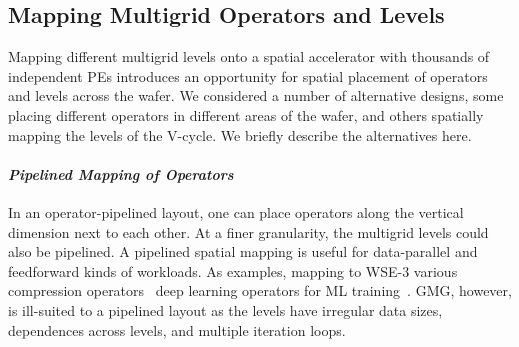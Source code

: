 \documentclass[conference]{IEEEtran}
\begin{document}
    
        \subsection{Mapping Multigrid Operators and Levels} 
        \label{sec:mapping_alternatives}
            Mapping different multigrid levels onto a spatial accelerator with thousands of independent PEs introduces an opportunity for spatial placement of operators and levels across the wafer. %
            We considered a number of alternative designs, some placing different operators in different areas of the wafer, and others spatially mapping the levels of the V-cycle.
            We briefly describe the alternatives here.

            \paragraph{\textit{Pipelined Mapping of Operators}}
            In an operator-pipelined layout, one can place operators
            along the vertical dimension next to each other. At a finer granularity, the multigrid levels could also be pipelined.
            A pipelined spatial mapping is useful for data-parallel and feedforward kinds of workloads.  As examples, mapping to WSE-3 
            various compression operators~\cite{song_ceresz} %
            deep learning operators for ML training~\cite{cerebras_execution_modes,cerebras_pipeline_dl}. GMG, however, is ill-suited to a pipelined layout as the levels have irregular data sizes, dependences across levels, and multiple iteration loops.
\end{document}

